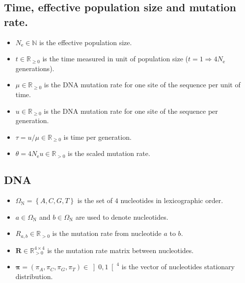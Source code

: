 \documentclass{article}
\newcommand{\e}{\mathrm{e}}
\newcommand{\Ne}{N_\e}
\newcommand{\SetNuc}{\Omega_{\mathrm{N}}}
\newcommand{\mutmatrix}{R}
\newcommand{\Mutmatrix}{\bm{\mutmatrix}}
\newcommand{\mutequi}{\pi}
\newcommand{\Mutequi}{\bm{\mutequi}}
\begin{document}
\subsection{Time, effective population size and mutation rate.}
\begin{itemize}
	\setlength\itemsep{-0.25em}
	\item $\Ne \in \mathbb{N}$ is the effective population size.
	\item $t \in \mathbb{R}_{\geq 0}$ is the time measured in unit of population size ($t=1 \Rightarrow 4 \Ne $ generations).
	\item $\mu \in \mathbb{R}_{\geq 0}$ is the DNA mutation rate for one site of the sequence per unit of time.
	\item $u \in \mathbb{R}_{\geq 0}$ is the DNA mutation rate for one site of the sequence per generation.
	\item $\tau = u / \mu \in \mathbb{R}_{\geq 0}$ is time per generation.
	\item $\theta=4 \Ne u \in \mathbb{R}_{>0} $ is the scaled mutation rate.
\end{itemize}

\subsection{DNA}
\begin{itemize}
	\setlength\itemsep{-0.25em}
	\item $ \SetNuc =\left\{ A,C,G,T \right\} $ is the set of $4$ nucleotides in lexicographic order.
	\item $a \in \SetNuc $ and $b \in \SetNuc $ are used to denote nucleotides.
	\item $\mutmatrix_{a,b} \in \mathbb{R}_{> 0}$ is the mutation rate from nucleotide $a$ to $b$.
	\item $\Mutmatrix \in \mathbb{R}_{> 0}^{4 \times 4} $ is the mutation rate matrix between nucleotides.
	\item $\Mutequi = \left(\mutequi_A , \mutequi_C , \mutequi_G , \mutequi_T \right) \in \left]0,1\right[^4$ is the vector of nucleotides stationary distribution.
\end{itemize}
\end{document}

